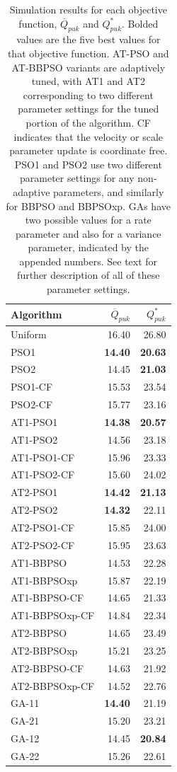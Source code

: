 \documentclass[cmbright]{staauth}
\begin{document}
\begin{table}[ht]
\centering
\begingroup\scriptsize
\begin{tabular}{lrr}
Algorithm & $\overline{Q}_{puk}$ & $Q^*_{puk}$ \\\hline
Uniform & 16.40 & 26.80 \\\hline
PSO1 & \bf{14.40} & \bf{20.63} \\
  PSO2 & 14.45 & \bf{21.03}\\
  PSO1-CF & 15.53 & 23.54 \\
  PSO2-CF & 15.77 & 23.16 \\
   \hline
AT1-PSO1 & \bf{14.38} & \bf{20.57} \\
  AT1-PSO2 & 14.56 & 23.18 \\
  AT1-PSO1-CF & 15.96 & 23.33 \\
  AT1-PSO2-CF & 15.60 & 24.02 \\
   \hline
AT2-PSO1 & \bf{14.42} & \bf{21.13} \\
  AT2-PSO2 & \bf{14.32} & 22.11 \\
  AT2-PSO1-CF & 15.85 & 24.00 \\
  AT2-PSO2-CF & 15.95 & 23.63 \\
   \hline
AT1-BBPSO & 14.53 & 22.28 \\
  AT1-BBPSOxp & 15.87 & 22.19 \\
  AT1-BBPSO-CF & 14.65 & 21.33 \\
  AT1-BBPSOxp-CF & 14.84 & 22.34 \\
   \hline
AT2-BBPSO & 14.65 & 23.49 \\
  AT2-BBPSOxp & 15.21 & 23.25 \\
  AT2-BBPSO-CF & 14.63 & 21.92\\
  AT2-BBPSOxp-CF & 14.52 & 22.76 \\
   \hline
GA-11 & \bf{14.40} & 21.19 \\
  GA-21 & 15.20 & 23.21 \\
  GA-12 & 14.45 & \bf{20.84} \\
  GA-22 & 15.26 & 22.61 \\
\hline
\end{tabular}
\endgroup
\caption{ Simulation results for each objective function, $\overline{Q}_{puk}$ and $Q^*_{puk}$. Bolded values are the five best values for that objective function. AT-PSO and AT-BBPSO variants are adaptively tuned, with AT1 and AT2 corresponding to two different parameter settings for the tuned portion of the algorithm. CF indicates that the velocity or scale parameter update is coordinate free. PSO1 and PSO2 use two different parameter settings for any non-adaptive parameters, and similarly for BBPSO and BBPSOxp. GAs have two possible values for a rate parameter and also for a variance parameter, indicated by the appended numbers. See text for further description of all of these parameter settings.}
\label{tab:psokriging}
\end{table}
\end{document}
